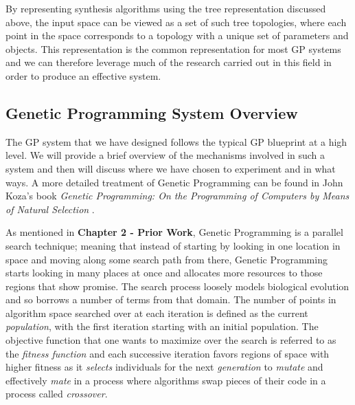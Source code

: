 \documentclass[a4paper,12pt]{report} 	%
\numberwithin{figure}{chapter}
\numberwithin{table}{chapter}
\numberwithin{equation}{chapter}
\begin{document}
\begin{flushleft}
By representing synthesis algorithms using the tree representation discussed above, the input space can be viewed as a set of such tree topologies, where each point in the space corresponds to a topology with a unique set of parameters and objects. This representation is the common representation for most GP systems and we can therefore leverage much of the research carried out in this field in order to produce an effective system.

\subsection{Genetic Programming System Overview}
The GP system that we have designed follows the typical GP blueprint at a high level. We will provide a brief overview of the mechanisms involved in such a system and then will discuss where we have chosen to experiment and in what ways. A more detailed treatment of Genetic Programming can be found in John Koza's book \emph{Genetic Programming: On the Programming of Computers by Means of Natural Selection} \cite{Koza:1992gp}.

As mentioned in \textbf{Chapter 2 - Prior Work}, Genetic Programming is a parallel search technique; meaning that instead of starting by looking in one location in space and moving along some search path from there, Genetic Programming starts looking in many places at once and allocates more resources to those regions that show promise. The search process loosely models biological evolution and so borrows a number of terms from that domain. The number of points in algorithm space searched over at each iteration is defined as the current \emph{population}, with the first iteration starting with an initial population. The objective function that one wants to maximize over the search is referred to as the \emph{fitness function} and each successive iteration favors regions of space with higher fitness as it \emph{selects} individuals for the next \emph{generation} to \emph{mutate} and effectively \emph{mate} in a process where algorithms swap pieces of their code in a process called \emph{crossover}. 


\end{flushleft}
\end{document}
